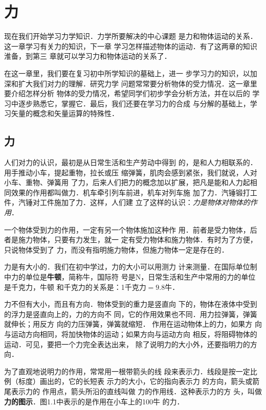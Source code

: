 \chapter{力}

    现在我们开始学习力学知识．力学所要解决的中心课题
是力和物体运动的关系．这一章学习有关力的知识，下一章
学习怎样描述物体的运动．有了这两章的知识淮备，到第三
章就可以学习力和物体运动的关系了．

    在这一章里，我们要在复习初中所学知识的墓础上，进一
步学习力的知识，以加深和扩大我们对力的理解．研究力学
问题常常要分析物体的受力情况．这一章里要介绍怎样分析
物体的受力情况，希望同学们初步学会分析方法，并在以后的
学习中逐步熟悉它，掌握它．最后，我们还要在学习力的合成
与分解的基础上，学习矢量的概念和矢量运算的特殊性．


\section{力}
    人们对力的认识，最初是从日常生活和生产劳动中得到
的，是和人力相联系的．用手推动小车，提起重物，拉长或压
缩弹簧，肌肉会感到紧张，我们就说，人对小车、重物、弹簧用
了力，后来人们把力的概念加以扩展，把凡是能和人力起相
同效果的作用都叫做力．机车牵引列车前进，机车对列车施
加了力．汽锤锻打工件，汽锤对工件施加了力．这样，人们建
立了这样的认识：\textit{力是物体对物体的作用}．

一个物体受到力的作用，一定有另一个物体施加这种作
用．前者是受力物体，后者是施力物体，只要有力发生，就一
定有受力物体和施力物体．有时为了方便，只说物体受到了
力，而没有指明施力物体，但施力物体一定是存在的．

    力是有大小的．我们在初中学过，力的大小可以用测力
计来测量．在国际单位制中力的单位是\textbf{牛顿}，简称牛，国际符
号是N，日常生活和生产中常用的力的单位是千克力，牛顿
和千克力的关系是：1千克力$=9.8$牛．

    力不但有大小，而且有方向．物体受到的重力是竖直向
下的，物体在液体中受到的浮力是竖直向上的，力的方向不
同，它的作用效果也不同．用力拉弹簧，弹簧就伸长；用反方
向的力压弹簧，弹簧就缩短．
作用在运动物体上的力，如果方
向与运动方向相同，将加快物体的运动；如果方向与运动方向
相反，将阻碍物体的运动．可见，要把一个力完全表达出来，
除了说明力的大小外，还要指明力的方向．

为了直观地说明力的作用，常常用一根带箭头的线
段来表示力．线段是按一定比
例（标度）画出的，它的长短表
示力的大小，它的指向表示力
的方向，箭头或箭尾表示力的
作用点，箭头所沿的直线叫做
力的作用线．这种表示力的方
头，叫做\textbf{力的图示}．图1.1中表示的是作用在小车上的100牛
的力．


